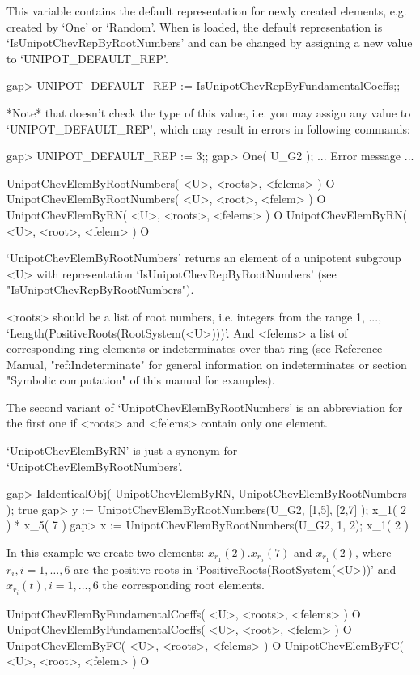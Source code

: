 This variable  contains  the  default representation  for  newly  created
elements, e.g. created by  `One' or `Random'. When  {\Unipot}  is loaded,
the  default representation is  `IsUnipotChevRepByRootNumbers' and can be
changed by assigning a new value to `UNIPOT_DEFAULT_REP'.

\beginexample
gap> UNIPOT_DEFAULT_REP := IsUnipotChevRepByFundamentalCoeffs;;
\endexample

*Note* that {\Unipot} doesn't check the type of this  value, i.e. you may
assign any value to `UNIPOT_DEFAULT_REP', which  may  result in errors in
following commands:

\begintt
gap> UNIPOT_DEFAULT_REP := 3;;
gap> One( U_G2 );
... Error message ...
\endtt

\>UnipotChevElemByRootNumbers( <U>, <roots>, <felems> ) O
\>UnipotChevElemByRootNumbers( <U>, <root>, <felem> ) O
\>UnipotChevElemByRN( <U>, <roots>, <felems> ) O
\>UnipotChevElemByRN( <U>, <root>, <felem> ) O

`UnipotChevElemByRootNumbers' returns  an element of a unipotent subgroup
<U>    with    representation    `Is\-UnipotChevRepByRootNumbers'    (see
"IsUnipotChevRepByRootNumbers").

<roots> should be a list of root numbers, i.e. integers from the range 1,
...,  `Length(PositiveRoots(Root\-System(<U>)))'. And <felems> a list  of
corresponding ring elements or indeterminates over that ring  (see {\GAP}
Reference   Manual,   "ref:Indeterminate"  for  general   information  on
indeterminates  or  section  "Symbolic computation"  of  this  manual for
examples).

The second  variant of  `UnipotChevElemByRootNumbers'  is an abbreviation
for the first one if <roots> and <felems> contain only one element.

`UnipotChevElemByRN' is just a synonym for `UnipotChevElemByRootNumbers'.

\beginexample
gap> IsIdenticalObj( UnipotChevElemByRN, UnipotChevElemByRootNumbers );
true
gap> y := UnipotChevElemByRootNumbers(U_G2, [1,5], [2,7] );
x_{1}( 2 ) * x_{5}( 7 )
gap> x := UnipotChevElemByRootNumbers(U_G2, 1, 2);
x_{1}( 2 )
\endexample

In this example we create two elements: $x_{r_1}( 2 ) . x_{r_5}( 7 )$ and
$x_{r_1}(  2  )$, where $r_i, i = 1,  \dots, 6$ are the positive roots in
`PositiveRoots(RootSystem(<U>))' and $x_{r_i}(t),  i  = 1, \dots, 6$  the
corresponding root elements.


\>UnipotChevElemByFundamentalCoeffs( <U>, <roots>, <felems> ) O
\>UnipotChevElemByFundamentalCoeffs( <U>, <root>, <felem> ) O
\>UnipotChevElemByFC( <U>, <roots>, <felems> ) O
\>UnipotChevElemByFC( <U>, <root>, <felem> ) O

